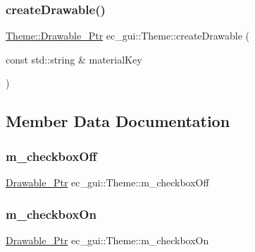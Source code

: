 \mbox{\label{classec__gui_1_1_theme_a8ce73f24f75e1ef74b02f0f55be07c2e}} 
\subsubsection{\texorpdfstring{create\+Drawable()}{createDrawable()}}
{\footnotesize\ttfamily \mbox{\hyperlink{classec__gui_1_1_theme_aa831418117dca2cf1b0c390bd0da97c1}{Theme\+::\+Drawable\+\_\+\+Ptr}} ec\+\_\+gui\+::\+Theme\+::create\+Drawable (\begin{DoxyParamCaption}\item[{const std\+::string \&}]{material\+Key }\end{DoxyParamCaption})\hspace{0.3cm}{\ttfamily [protected]}}



\subsection{Member Data Documentation}
\mbox{\label{classec__gui_1_1_theme_a8dd8bb49546b8b476ef71fae6d3b9ec3}} 
\subsubsection{\texorpdfstring{m\+\_\+checkbox\+Off}{m\_checkboxOff}}
{\footnotesize\ttfamily \mbox{\hyperlink{classec__gui_1_1_theme_aa831418117dca2cf1b0c390bd0da97c1}{Drawable\+\_\+\+Ptr}} ec\+\_\+gui\+::\+Theme\+::m\+\_\+checkbox\+Off}

\mbox{\label{classec__gui_1_1_theme_a49c2976f9ccb512414836cbd0711dc1c}} 
\subsubsection{\texorpdfstring{m\+\_\+checkbox\+On}{m\_checkboxOn}}
{\footnotesize\ttfamily \mbox{\hyperlink{classec__gui_1_1_theme_aa831418117dca2cf1b0c390bd0da97c1}{Drawable\+\_\+\+Ptr}} ec\+\_\+gui\+::\+Theme\+::m\+\_\+checkbox\+On}

